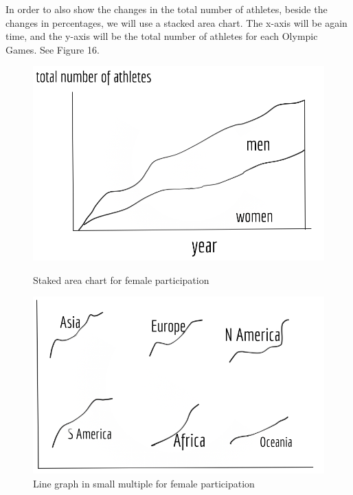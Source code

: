 \documentclass[12pt]{article}
\begin{document}
In order to also show the changes in the total number of athletes, beside the changes in percentages, we will use a stacked area chart. The x-axis will be again time, and the y-axis will be the total number of athletes for each Olympic Games. See Figure 16.

\begin{figure}[!b]
  \begin{minipage}[b]{0.45\textwidth}
  \centering
    \includegraphics[scale=0.3]{pics/3.png}
    \caption{\small Staked area chart for female participation}
    \label{fig:1}
  \end{minipage}
  \hfill
  \begin{minipage}[b]{0.45\textwidth}
  \centering
    \includegraphics[scale=0.3]{pics/4.png}
    \caption{\small Line graph in small multiple for female participation}
    \label{fig:2}
  \end{minipage}
\end{figure}
\end{document}
